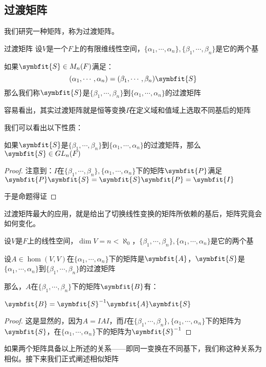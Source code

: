 \documentclass[12pt, a4paper, oneside, UTF8]{ctexbook}
\begin{document}
		\subsection{过渡矩阵}
			我们研究一种矩阵，称为过渡矩阵。
			\begin{defn}{过渡矩阵}{}
				设$V$是一个$F$上的有限维线性空间，$\{\alpha_1,\cdots,\alpha_n\},\{\beta_1,\cdots,\beta_n\}$是它的两个基

				如果$\symbfit{S} \in M_{n}(F)$满足：
				\begin{equation}
					(\alpha_1,\cdots,\alpha_n)=(\beta_1,\cdots,\beta_n)\symbfit{S}
				\end{equation}
				那么我们称$\symbfit{S}$是$\{\beta_1,\cdots,\beta_n\}$到$\{\alpha_1,\cdots,\alpha_n\}$的过渡矩阵
			\end{defn}
			容易看出，其实过渡矩阵就是恒等变换$I$在定义域和值域上选取不同基后的矩阵

			我们可以看出以下性质：
			\begin{para}{0}
				\point{}
					\begin{proposition}
						如果$\symbfit{S}$是$\{\beta_1,\cdots,\beta_n\}$到$\{\alpha_1,\cdots,\alpha_n\}$的过渡矩阵，那么$\symbfit{S}\in  GL_n(F)$
					\end{proposition}
					\begin{proof}
						注意到：$I$在$\{\beta_1,\cdots,\beta_n\},\{\alpha_1,\cdots,\alpha_n\}$下的矩阵$\symbfit{P}$满足$\symbfit{P}\symbfit{S}=\symbfit{S}\symbfit{P}=\symbfit{I}$

						于是命题得证
					\end{proof}
				\point{}

					过渡矩阵最大的应用，就是给出了切换线性变换的矩阵所依赖的基后，矩阵究竟会如何变化。
					\begin{proposition}
						设$V$是$F$上的线性空间，$\dim V = n < \aleph_0$，$\{\beta_1,\cdots,\beta_n\},\{\alpha_1,\cdots,\alpha_n\}$是它的两个基

						设$A \in \hom(V,V)$在$\{\alpha_1,\cdots,\alpha_n\}$下的矩阵是$\symbfit{A}$，$\symbfit{S}$是$\{\alpha _1,\cdots,\alpha _n\}$到$\{\beta _1,\cdots,\beta _n\}$的过渡矩阵
					
						那么，$A$在$\{\beta_1,\cdots,\beta_n\}$下的矩阵$\symbfit{B}$有：

						$\symbfit{B}=\symbfit{S}^{-1}\symbfit{A}\symbfit{S}$
					\end{proposition}
					\begin{proof}
						这是显然的，因为$A=IAI$，而$I$在$\{\beta_1,\cdots,\beta_n\},\{\alpha_1,\cdots,\alpha_n\}$下的矩阵为$\symbfit{S}$，在$\{\alpha_1,\cdots,\alpha_n\}$下的矩阵为$\symbfit{S}^{-1}$
					\end{proof}
					如果两个矩阵具备以上所述的关系——即同一变换在不同基下，我们称这种关系为相似。接下来我们正式阐述相似矩阵
			\end{para}
\end{document}
